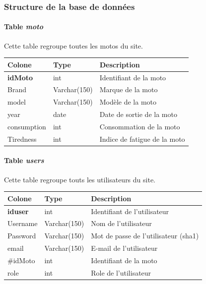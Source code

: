 \documentclass[a4paper]{article}
\newcommand{\bdd}{base de données}
\begin{document}
\subsubsection{Structure de la \bdd}
\paragraph{Table \emph{moto}}
Cette table regroupe toutes les motos du site.

\begin{tabular}{|l|l|l|}
	\hline
	Colone          & Type         & Description                  \\ \hline\hline
	\textbf{idMoto} & int          & Identifiant de la moto       \\ \hline
	Brand           & Varchar(150) & Marque de la moto            \\ \hline
	model           & Varchar(150) & Modèle de la moto            \\ \hline
	year            & date         & Date de sortie de la moto    \\ \hline
	consumption     & int          & Consommation de la moto      \\ \hline
	Tiredness       & int          & Indice de fatigue de la moto \\ \hline
\end{tabular}

\paragraph{Table \emph{users}}
Cette table regroupe touts les utilisateurs du site.

\begin{tabular}{|l|l|l|}
	\hline
	Colone          & Type         & Description                  \\ \hline\hline
	\textbf{iduser} & int & Identifiant de l'utilisateur \\ \hline
	Username & Varchar(150) & Nom de l'utilisateur \\ \hline
	Password & Varchar(150) & Mot de passe de l'utilisateur (sha1) \\ \hline
	email & Varchar(150) & E-mail de l'utilisateur \\ \hline
	\#idMoto & int & Identifiant de la moto \\ \hline
	role & int & Role de l'utilisateur \\ \hline
\end{tabular}
\end{document}
